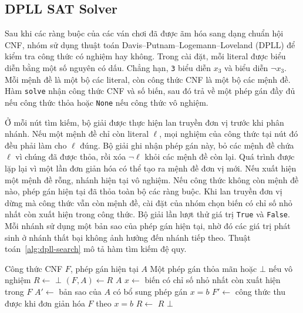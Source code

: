 \subsection{DPLL SAT Solver}
Sau khi các ràng buộc của các ván chơi đã được ãm hóa sang dạng chuẩn hội CNF, nhóm sử dụng thuật toán Davis--Putnam--Logemann--Loveland (DPLL) để kiểm tra công thức có nghiệm hay không. 
Trong cài đặt, mỗi literal được biểu diễn bằng một số nguyên có dấu. Chẳng hạn, \texttt{3} biểu diễn $x_3$ và  biểu diễn $\neg x_3$. Mỗi mệnh đề là
một bộ các literal, còn công thức CNF là một bộ các mệnh đề. Hàm \texttt{solve} nhận công thức CNF và số biến, sau đó trả về một phép gán đầy đủ nếu công thức thỏa hoặc \texttt{None} nếu công thức vô nghiệm.

Ở mỗi nút tìm kiếm, bộ giải được thực hiện lan truyền đơn vị trước khi phân nhánh.
Nếu một mệnh đề chỉ còn literal $\ell$, mọi nghiệm của công thức tại nút đó đều phải làm cho $\ell$ đúng. 
Bộ giải ghi nhận phép gán này, bỏ các mệnh đề chứa $\ell$
vì chúng đã được thỏa, rồi xóa $\neg\ell$ khỏi các mệnh đề còn lại.
Quá trình được lặp lại vì một lần đơn giản hóa có thể tạo ra mệnh đề
đơn vị mới. Nếu xuất hiện một mệnh đề rỗng, nhánh hiện tại vô nghiệm.
Nếu công thức không còn mệnh đề nào, phép gán hiện tại đã thỏa toàn bộ
các ràng buộc.
Khi lan truyền đơn vị dừng mà công thức vẫn còn mệnh đề, cài đặt của
nhóm chọn biến có chỉ số nhỏ nhất còn xuất hiện trong công thức.
Bộ giải lần lượt thử giá trị \texttt{True} và \texttt{False}. Mỗi
nhánh sử dụng một bản sao của phép gán hiện tại, nhờ đó các giá trị
phát sinh ở nhánh thất bại không ảnh hưởng đến nhánh tiếp theo.
Thuật toán~\ref{alg:dpll-search} mô tả hàm tìm kiếm đệ quy.

\begin{algorithm}[htbp]
    \caption{Tìm kiếm nghiệm bằng DPLL}
    \label{alg:dpll-search}
    \begin{algorithmic}[1]
        \Require Công thức CNF $F$, phép gán hiện tại $A$
        \Ensure Một phép gán thỏa mãn hoặc $\bot$ nếu vô nghiệm
        \State $R \gets$ 
            \State \Return $\bot$
        \EndIf
        \State $(F,A) \gets R$
            \State \Return $A$
        \EndIf
        \State $x \gets$ biến có chỉ số nhỏ nhất còn xuất hiện trong $F$
            \State $A' \gets$ bản sao của $A$ có bổ sung phép gán $x=b$
            \State $F' \gets$ công thức thu được khi đơn giản hóa $F$ theo $x=b$
            \State $R \gets$ 
                \State \Return $R$
            \EndIf
        \EndFor
        \State \Return $\bot$
    \end{algorithmic}
\end{algorithm}

